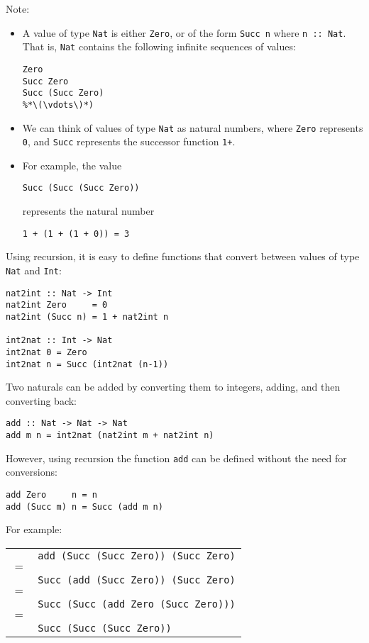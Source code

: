 \begin{multicols}{2}
Note:
\begin{itemize}
  \item A value of type \lstinline{Nat} is either \lstinline{Zero}, or of the form \lstinline{Succ n} where \lstinline{n :: Nat}. That is, \lstinline{Nat} contains the following infinite sequences of values:
\begin{lstlisting}
Zero
Succ Zero
Succ (Succ Zero)
%*\(\vdots\)*)
\end{lstlisting}
  \item We can think of values of type \lstinline{Nat} as natural numbers, where \lstinline{Zero} represents \lstinline{0}, and \lstinline{Succ} represents the successor function \lstinline{1+}.
  \item For example, the value
\begin{lstlisting}
Succ (Succ (Succ Zero))
\end{lstlisting}
  represents the natural number
\begin{lstlisting}
1 + (1 + (1 + 0)) = 3
\end{lstlisting}
\end{itemize}

Using recursion, it is easy to define functions that convert between values of type \lstinline{Nat} and \lstinline{Int}:
\begin{lstlisting}
nat2int :: Nat -> Int
nat2int Zero     = 0
nat2int (Succ n) = 1 + nat2int n

int2nat :: Int -> Nat
int2nat 0 = Zero
int2nat n = Succ (int2nat (n-1))
\end{lstlisting}

Two naturals can be added by converting them to integers, adding, and then converting back:
\begin{lstlisting}
add :: Nat -> Nat -> Nat
add m n = int2nat (nat2int m + nat2int n)
\end{lstlisting}

However, using recursion the function \lstinline{add} can be defined without the need for conversions:
\begin{lstlisting}
add Zero     n = n
add (Succ m) n = Succ (add m n)
\end{lstlisting}

For example:
\begin{tabularx}{\linewidth}{lX}
  & \lstinline{add (Succ (Succ Zero)) (Succ Zero)}\\
  \(=\) & \\
  & \lstinline{Succ (add (Succ Zero)) (Succ Zero)}\\
  \(=\) & \\
  & \lstinline{Succ (Succ (add Zero (Succ Zero)))}\\
  \(=\) & \\
  & \lstinline{Succ (Succ (Succ Zero))}\\
\end{tabularx}


\end{multicols}
